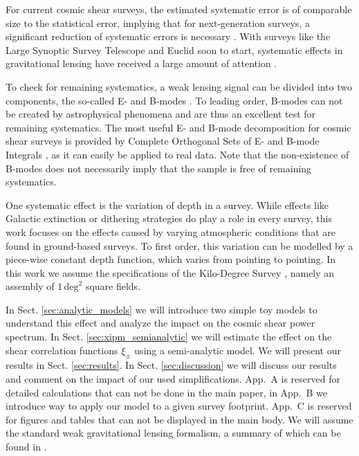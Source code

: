 \documentclass{aa}
\begin{document}
For current cosmic shear surveys, the estimated systematic error is of comparable size to the statistical error, implying that for next-generation surveys, a significant reduction of systematic errors is necessary \citep[][hereafter H17]{2017MNRAS.465.1454H}. With surveys like the Large Synoptic Survey Telescope \citep[LSST,][]{Ivezic:2008} and Euclid \citep{Laureijs:2011} soon to start, systematic effects in gravitational lensing have received a large amount of attention \citep{2018arXiv181002353A,2019arXiv190207439B,2019arXiv190109488S}.

To check for remaining systematics, a weak lensing signal can be divided into two components, the so-called E- and B-modes \citep{2002ApJ...568...20C,2002A&A...389..729S}. To leading order, B-modes can not be created by astrophysical phenomena and are thus an excellent test for remaining systematics. The most useful E- and B-mode decomposition for cosmic shear surveys is provided by Complete Orthogonal Sets of E- and B-mode Integrals \citep[COSEBIs,][hereafter S10]{2010A&A...520A.116S}, as it can easily be applied to real data. Note that the non-existence of B-modes does not necessarily imply that the sample is free of remaining systematics.

One systematic effect is the variation of depth in a survey. While effects like Galactic extinction or dithering strategies do play a role in every survey, this work focuses on the effects caused by varying atmospheric conditions that are found in ground-based surveys. To first order, this variation can be modelled by a piece-wise constant depth function, which varies from pointing to pointing. In this work we assume the specifications of the Kilo-Degree Survey \citep[KiDS,][]{Kuijken:2015}, namely an assembly of $1\,\text{deg}^2$ square fields. 

%

In Sect. \ref{sec:analytic_models} we will introduce two simple toy models to understand this effect and analyze the impact on the cosmic shear power spectrum. In Sect. \ref{sec:xipm_semianalytic} we will estimate the effect on the shear correlation functions $\xi_\pm$ using a semi-analytic model. We will present our results in Sect. \ref{sec:results}. In Sect. \ref{sec:discussion} we will discuss our results and comment on the impact of our used simplifications. App.~A is reserved for detailed calculations that can not be done in the main paper, in App.~B we introduce way to apply our model to a given survey footprint. App.~C is reserved for figures and tables that can not be displayed in the main body. We will assume the standard weak gravitational lensing formalism, a summary of which can be found in \citet{2001PhR...340..291B}.
\end{document}
